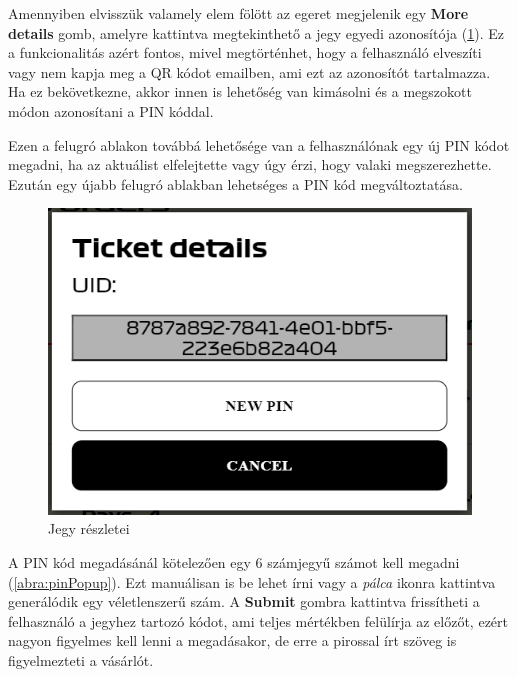 Amennyiben elvisszük valamely elem fölött az egeret megjelenik egy \textbf{More details} gomb, amelyre kattintva megtekinthető a jegy egyedi azonosítója (\ref{abra:moreDetails}). Ez a funkcionalitás azért fontos, mivel megtörténhet, hogy a felhasználó elveszíti vagy nem kapja meg a QR kódot emailben, ami ezt az azonosítót tartalmazza. Ha ez bekövetkezne, akkor innen is lehetőség van kimásolni és a megszokott módon azonosítani a PIN kóddal.

Ezen a felugró ablakon továbbá lehetősége van a felhasználónak egy új PIN kódot megadni, ha az aktuálist elfelejtette vagy úgy érzi, hogy valaki megszerezhette. Ezután egy újabb felugró ablakban lehetséges a PIN kód megváltoztatása. 

\begin{figure}[!h]
	\centering
	\includegraphics[scale=0.4]{images/moreDetails}
	\caption{Jegy részletei}
	\label{abra:moreDetails}
\end{figure}

A PIN kód megadásánál kötelezően egy 6 számjegyű számot kell megadni (\ref{abra:pinPopup}). Ezt manuálisan is be lehet írni vagy a \textit{pálca} ikonra kattintva generálódik egy véletlenszerű szám. A \textbf{Submit} gombra kattintva frissítheti a felhasználó a jegyhez tartozó kódot, ami teljes mértékben felülírja az előzőt, ezért nagyon figyelmes kell lenni a megadásakor, de erre a pirossal írt szöveg is figyelmezteti a vásárlót.

